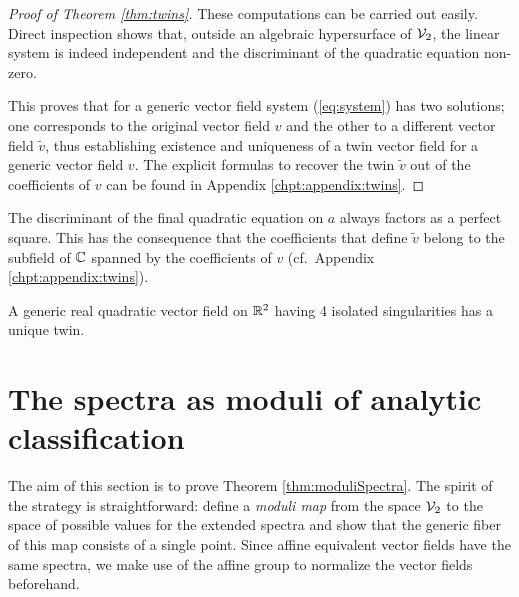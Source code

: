 \documentclass[phd,tocprelim]{cornell}
\begin{document}
\begin{proof}[Proof of Theorem \ref*{thm:twins}]
These computations can be carried out easily. Direct inspection shows that, outside an algebraic hypersurface of $\mathcal{V}_2$, the linear system is indeed independent and the discriminant of the quadratic equation non-zero. 


This proves that for a generic vector field system (\ref{eq:system}) has two solutions; one corresponds to the original vector field $v$ and the other to a different vector field $\tilde{v}$, thus establishing existence and uniqueness of a twin vector field for a generic vector field $v$. The explicit formulas to recover the twin $\tilde{v}$ out of the coefficients of $v$ can be found in Appendix \ref{chpt:appendix:twins}.
\end{proof}

\begin{remark}
 The discriminant of the final quadratic equation on $a$ always factors as a perfect square. This has the consequence that the coefficients that define $\tilde{v}$ belong to the subfield of $\mathbb{C}$ spanned by the coefficients of $v$ (cf.~Appendix \ref{chpt:appendix:twins}).
\end{remark}

\begin{corollary}
 A generic real quadratic vector field on $\mathbb{R}^2$ having 4 isolated singularities has a unique twin.
\end{corollary}




\section{The spectra as moduli of analytic classification}

The aim of this section is to prove Theorem \ref{thm:moduliSpectra}. The spirit of the strategy is straightforward: define a \textit{moduli map} from the space $\mathcal{V}_2$ to the space of possible values for the extended spectra and show that the generic fiber of this map consists of a single point. Since affine equivalent vector fields have the same spectra, we make use of the affine group to normalize the vector fields beforehand.
\end{document}
